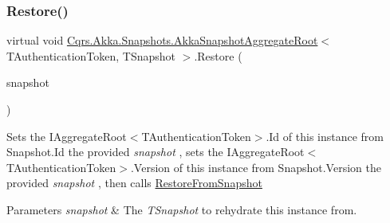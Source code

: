 \mbox{\label{classCqrs_1_1Akka_1_1Snapshots_1_1AkkaSnapshotAggregateRoot_a3dc19cbc4e4adbba79d3e7452dca5d5e_a3dc19cbc4e4adbba79d3e7452dca5d5e}} 
\subsubsection{\texorpdfstring{Restore()}{Restore()}}
{\footnotesize\ttfamily virtual void \hyperlink{classCqrs_1_1Akka_1_1Snapshots_1_1AkkaSnapshotAggregateRoot}{Cqrs.\+Akka.\+Snapshots.\+Akka\+Snapshot\+Aggregate\+Root}$<$ T\+Authentication\+Token, T\+Snapshot $>$.Restore (\begin{DoxyParamCaption}\item[{T\+Snapshot}]{snapshot }\end{DoxyParamCaption})\hspace{0.3cm}{\ttfamily [virtual]}}



Sets the I\+Aggregate\+Root$<$\+T\+Authentication\+Token$>$.\+Id of this instance from Snapshot.\+Id the provided {\itshape snapshot} , sets the I\+Aggregate\+Root$<$\+T\+Authentication\+Token$>$.\+Version of this instance from Snapshot.\+Version the provided {\itshape snapshot} , then calls \hyperlink{classCqrs_1_1Akka_1_1Snapshots_1_1AkkaSnapshotAggregateRoot_ad0a742b95699a997e51f03140c50fb74_ad0a742b95699a997e51f03140c50fb74}{Restore\+From\+Snapshot} 


\begin{DoxyParams}{Parameters}
{\em snapshot} & The {\itshape T\+Snapshot}  to rehydrate this instance from.\\
\hline
\end{DoxyParams}
\mbox{\label{classCqrs_1_1Akka_1_1Snapshots_1_1AkkaSnapshotAggregateRoot_ad0a742b95699a997e51f03140c50fb74_ad0a742b95699a997e51f03140c50fb74}} 
